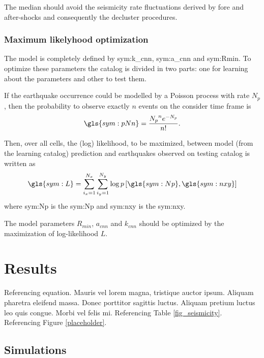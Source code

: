 \documentclass[draft, grl]{agutex}
\begin{document}
\begin{article}
The median should avoid the seismicity rate fluctuations derived by fore and after-shocks and consequently the decluster procedures.


\subsubsection{Maximum likelyhood optimization}

The model is completely defined by \gls{sym:k_cnn}, \gls{sym:a_cnn} and \gls{sym:Rmin}. To optimize these parameters the catalog is divided in two parts: one for learning about the parameters and other to test them.

If the earthquake occurrence could be modelled by a Poisson process with rate $N_p$, then the probability to observe exactly $n$ events on the consider time frame is
\begin{equation}
	\ensuremath{
		\gls{sym:pNn} = \frac{{N_p}^n e^{-N_p}}{n!}.
	}
	\label{eq:poisson_probability}
\end{equation}

Then, over all cells, the (log) likelihood, to be maximized, between model (from the learning catalog) prediction and earthquakes observed on testing catalog is written as
\begin{equation}
	\ensuremath{
		\gls{sym:L} = \sum_{i_x=1}^{N_x}\sum_{i_y=1}^{N_y}\log p\left[  \gls{sym:Np}, \gls{sym:nxy}  \right]
	}
	\label{eq:loglik}
\end{equation}
where \gls{sym:Np} is the \glsdesc{sym:Np} and
	  \gls{sym:nxy} is the \glsdesc{sym:nxy}.

The model parameters $R_{min}$, $a_{cnn}$ and $k_{cnn}$ should be optimized by the maximization of log-likelihood $L$.



\section{Results}

Referencing equation. Mauris vel lorem magna, tristique auctor ipsum. Aliquam pharetra eleifend massa. Donec porttitor sagittis luctus. Aliquam pretium luctus leo quis congue. Morbi vel felis mi. Referencing Table \ref{fig_seismicity}. Referencing Figure \ref{placeholder}.

\subsection{Simulations}


\end{article}
\end{document}
